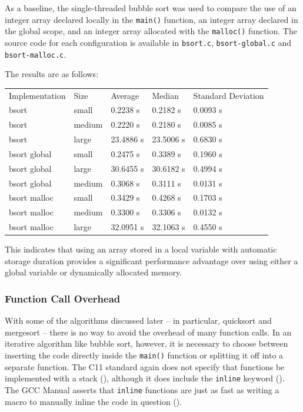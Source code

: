 \documentclass{article}
\begin{document}
As a baseline, the single-threaded bubble sort was used to compare the
use of an integer array declared locally in the \texttt{main()}
function, an integer array declared in the global scope, and an
integer array allocated with the \texttt{malloc()} function. The
source code for each configuration is available in \texttt{bsort.c},
\texttt{bsort-global.c} and \texttt{bsort-malloc.c}. \bigskip

The results are as follows:
\begin{center}
\begin{tabular}{lllll}
 Implementation  &  Size & Average  &  Median     &  Standard Deviation             \\
 bsort           &  small    &  0.2238 s   &  0.2182 s            &  0.0093 s  \\
 bsort           &  medium   &  0.2220 s   &  0.2180 s            &  0.0085 s  \\
 bsort           &  large    &  23.4886 s  &  23.5006 s           &  0.6830 s  \\
 bsort global    &  small    &  0.2475 s   &  0.3389 s            &
 0.1960 s  \\
bsort global    &  large    &  30.6455 s  &  30.6182 s           &  0.4994 s  \\
 bsort global    &  medium   &  0.3068 s   &  0.3111 s            &  0.0131 s  \\
 bsort malloc    &  small    &  0.3429 s   &  0.4268 s            &  0.1703 s  \\
 bsort malloc    &  medium   &  0.3300 s   &  0.3306 s            &
 0.0132 s  \\
bsort malloc    &  large    &  32.0951 s  &  32.1063 s           &  0.4550 s  \\
\end{tabular}
\end{center}

This indicates that using an array stored in a local variable with automatic storage
duration provides a significant performance advantage over using
either a global variable or dynamically allocated memory.

\subsubsection{Function Call Overhead}
With some of the algorithms discussed later -- in particular,
quicksort and mergesort -- there is no way to avoid the overhead of
many function calls. In an iterative algorithm like bubble sort,
however, it is necessary to choose between inserting the code directly inside
the \texttt{main()} function or splitting it off into a separate
function. The C11 standard again does not specify that functions be
implemented with a stack (\cite[\S 6.7.6.3]{CStd}), although it does
include the \texttt{inline} keyword (\cite[\S 6.4.1, \S
6.7.4]{CStd}). The GCC Manual asserts that \texttt{inline} functions
are just as fast as writing a macro to manually inline the code in
question (\cite[\S 6.39]{GCCMan}).
\end{document}
